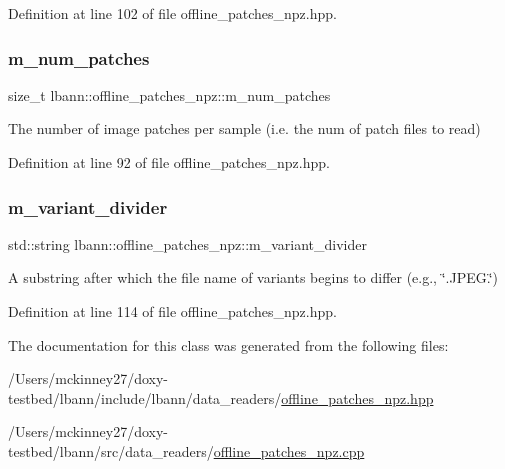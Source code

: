 Definition at line 102 of file offline\+\_\+patches\+\_\+npz.\+hpp.

\mbox{\label{classlbann_1_1offline__patches__npz_a5c13583d344641295301f82a32ebee41}} 
\subsubsection{\texorpdfstring{m\+\_\+num\+\_\+patches}{m\_num\_patches}}
{\footnotesize\ttfamily size\+\_\+t lbann\+::offline\+\_\+patches\+\_\+npz\+::m\+\_\+num\+\_\+patches\hspace{0.3cm}{\ttfamily [protected]}}



The number of image patches per sample (i.\+e. the num of patch files to read) 



Definition at line 92 of file offline\+\_\+patches\+\_\+npz.\+hpp.

\mbox{\label{classlbann_1_1offline__patches__npz_aaab0b9040ce248875b6cdb430e054b3a}} 
\subsubsection{\texorpdfstring{m\+\_\+variant\+\_\+divider}{m\_variant\_divider}}
{\footnotesize\ttfamily std\+::string lbann\+::offline\+\_\+patches\+\_\+npz\+::m\+\_\+variant\+\_\+divider\hspace{0.3cm}{\ttfamily [protected]}}



A substring after which the file name of variants begins to differ (e.\+g., \char`\"{}.\+J\+P\+E\+G.\char`\"{}) 



Definition at line 114 of file offline\+\_\+patches\+\_\+npz.\+hpp.



The documentation for this class was generated from the following files\+:\begin{DoxyCompactItemize}
\item 
/\+Users/mckinney27/doxy-\/testbed/lbann/include/lbann/data\+\_\+readers/\hyperlink{offline__patches__npz_8hpp}{offline\+\_\+patches\+\_\+npz.\+hpp}\item 
/\+Users/mckinney27/doxy-\/testbed/lbann/src/data\+\_\+readers/\hyperlink{offline__patches__npz_8cpp}{offline\+\_\+patches\+\_\+npz.\+cpp}\end{DoxyCompactItemize}
